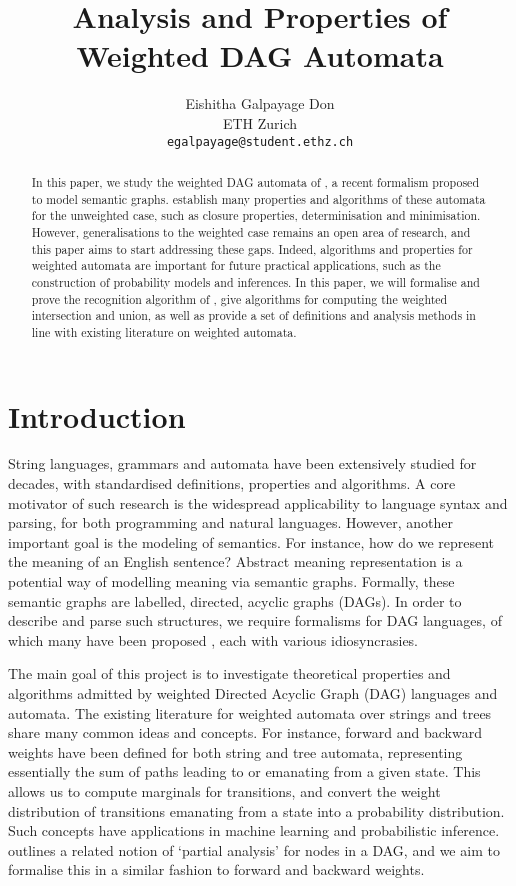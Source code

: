 \documentclass[11pt]{article}
\title{Analysis and Properties of Weighted DAG Automata}
\author{ Eishitha Galpayage Don \\
  ETH Zurich \\
  \texttt{egalpayage@student.ethz.ch} \\}
\begin{document}
\maketitle
\begin{abstract}
In this paper, we study the weighted DAG automata of \citet{chiang2018weighted},
a recent formalism proposed to model semantic graphs. \citet{blum2019properties}
establish many properties and algorithms of these automata for the unweighted
case, such as closure properties, determinisation and minimisation. However,
generalisations to the weighted case remains an open area of research, and this
paper aims to start addressing these gaps. Indeed, algorithms and properties for
weighted automata are important for future practical applications, such as the
construction of probability models and inferences. In this paper, we will
formalise and prove the recognition algorithm of \cite{chiang2018weighted}, give
algorithms for computing the weighted intersection and union, as well as provide
a set of definitions and analysis methods in line with existing literature on
weighted automata. 
\end{abstract}

\section{Introduction}
String languages, grammars and automata have been extensively studied for
decades, with standardised definitions, properties and algorithms. A core
motivator of such research is the widespread applicability to language syntax
and parsing, for both programming and natural languages. However, another
important goal is the modeling of semantics. For instance, how do we represent
the meaning of an English sentence? Abstract meaning representation
\cite{banarescu2013abstract} is a potential way of modelling meaning via
semantic graphs. Formally, these semantic graphs are labelled, directed, acyclic
graphs (DAGs). In order to describe and parse such structures, we require
formalisms for DAG languages, of which many have been proposed
\cite{kamimura1981parallel, quernheim2012dagger, priese2007finite}, each with
various idiosyncrasies.

The main goal of this project is to investigate theoretical properties and
algorithms admitted by weighted Directed Acyclic Graph (DAG) languages and
automata. The existing literature for weighted automata over strings and trees
share many common ideas and concepts. For instance, forward and backward
weights have been defined for both string and tree automata, representing
essentially the sum of paths leading to or emanating from a given state. This
allows us to compute marginals for transitions, and convert the weight
distribution of transitions emanating from a state into a probability
distribution. Such concepts have applications in machine learning and
probabilistic inference. \cite{chiang2018weighted} outlines a related notion of
`partial analysis' for nodes in a DAG, and we aim to formalise this in a similar
fashion to forward and backward weights. 
\end{document}
